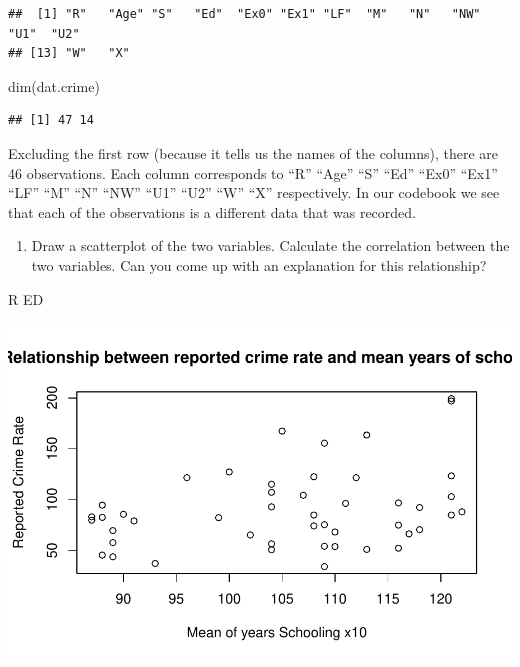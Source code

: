 \documentclass[
]{article}
\newenvironment{Shaded}{\begin{snugshade}}{\end{snugshade}}
\newcommand{\AttributeTok}[1]{\textcolor[rgb]{0.77,0.63,0.00}{#1}}
\newcommand{\FunctionTok}[1]{\textcolor[rgb]{0.00,0.00,0.00}{#1}}
\newcommand{\NormalTok}[1]{#1}
\newcommand{\SpecialCharTok}[1]{\textcolor[rgb]{0.00,0.00,0.00}{#1}}
\newcommand{\StringTok}[1]{\textcolor[rgb]{0.31,0.60,0.02}{#1}}
\providecommand{\tightlist}{%
  \setlength{\itemsep}{0pt}\setlength{\parskip}{0pt}}
\begin{document}
\begin{verbatim}
##  [1] "R"   "Age" "S"   "Ed"  "Ex0" "Ex1" "LF"  "M"   "N"   "NW"  "U1"  "U2" 
## [13] "W"   "X"
\end{verbatim}

\begin{Shaded}
\begin{Highlighting}[]
\FunctionTok{dim}\NormalTok{(dat.crime)}
\end{Highlighting}
\end{Shaded}

\begin{verbatim}
## [1] 47 14
\end{verbatim}

Excluding the first row (because it tells us the names of the columns),
there are 46 observations. Each column corresponds to ``R'' ``Age''
``S'' ``Ed'' ``Ex0'' ``Ex1'' ``LF'' ``M'' ``N'' ``NW'' ``U1'' ``U2''
``W'' ``X'' respectively. In our codebook we see that each of the
observations is a different data that was recorded.

\begin{enumerate}
\def\labelenumi{\arabic{enumi}.}
\setcounter{enumi}{1}
\tightlist
\item
  Draw a scatterplot of the two variables. Calculate the correlation
  between the two variables. Can you come up with an explanation for
  this relationship?
\end{enumerate}

R ED

\begin{Shaded}
\end{Shaded}

\includegraphics{Journal_files/figure-latex/unnamed-chunk-37-1.pdf}
\end{document}
